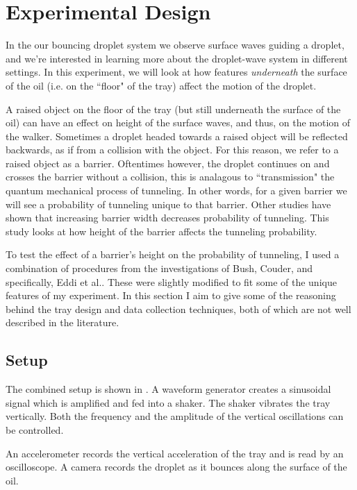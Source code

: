 \chapter{Experimental Design}

In the our bouncing droplet system we observe surface waves guiding a droplet, and we're interested in learning more about the droplet-wave system in different settings. In this experiment, we will look at how features \textit{underneath} the surface of the oil (i.e. on the ``floor" of the tray) affect the motion of the droplet. 

A raised object on the floor of the tray (but still underneath the surface of the oil) can have an effect on height of the surface waves, and thus, on the motion of the walker. Sometimes a droplet headed towards a raised object will be reflected backwards, as if from a collision with the object. For this reason, we refer to a raised object as a barrier. Oftentimes however, the droplet continues on and crosses the barrier without a collision, this is analagous to ``transmission" the quantum mechanical process of tunneling. In other words, for a given barrier we will see a probability of tunneling unique to that barrier. Other studies have shown that increasing barrier width decreases probability of tunneling. This study looks at how height of the barrier affects the tunneling probability. 

To test the effect of a barrier's height on the probability of tunneling, I used a combination of procedures from the investigations of Bush, Couder, and specifically, Eddi et al.. These were slightly modified to fit some of the unique features of my experiment. In this section I aim to give some of the reasoning behind the tray design and data collection techniques, both of which are not well described in the literature.

\section{Setup}
    The combined setup is shown in . A waveform generator creates a sinusoidal signal which is amplified and fed into a shaker. The shaker vibrates the tray vertically. Both the frequency and the amplitude of the vertical oscillations can be controlled. 
    
    An accelerometer records the vertical acceleration of the tray and is read by an oscilloscope. A camera records the droplet as it bounces along the surface of the oil.  
    
